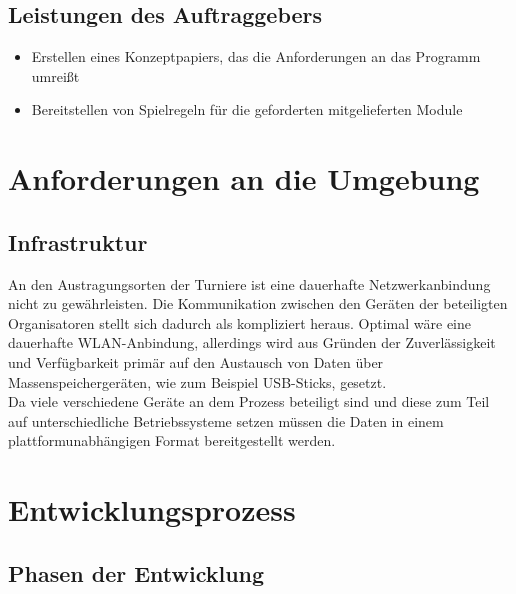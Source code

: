 \documentclass[11pt]{article}
\begin{document}
\subsection{Leistungen des Auftraggebers}

\begin{itemize}
	\item Erstellen eines Konzeptpapiers, das die Anforderungen an das Programm umreißt
	\item Bereitstellen von Spielregeln für die geforderten mitgelieferten Module
\end{itemize}

\newpage

\section{Anforderungen an die Umgebung}

\subsection{Infrastruktur}

An den Austragungsorten der Turniere ist eine dauerhafte Netzwerkanbindung nicht zu gewährleisten. Die Kommunikation zwischen den Geräten der beteiligten Organisatoren stellt sich dadurch als kompliziert heraus. Optimal wäre eine dauerhafte WLAN-Anbindung, allerdings wird aus Gründen der Zuverlässigkeit und Verfügbarkeit primär auf den Austausch von Daten über Massenspeichergeräten, wie zum Beispiel USB-Sticks, gesetzt.\\
Da viele verschiedene Geräte an dem Prozess beteiligt sind und diese zum Teil auf unterschiedliche Betriebssysteme setzen müssen die Daten in einem plattformunabhängigen Format bereitgestellt werden.

\newpage

\section{Entwicklungsprozess}

\subsection{Phasen der Entwicklung}
\end{document}
